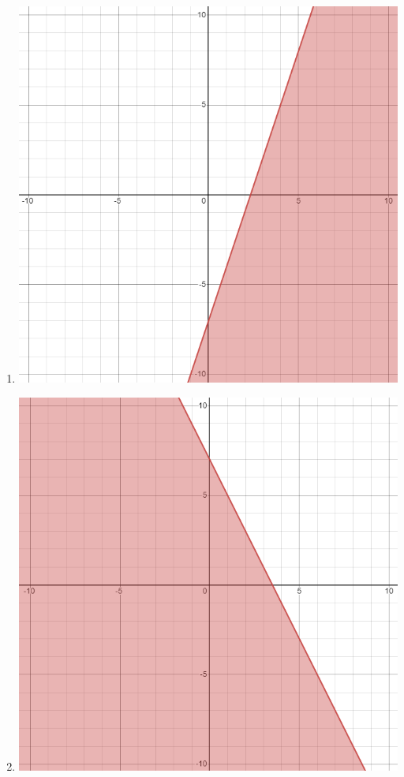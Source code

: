 \begin{enumerate}
\begin{enumerate}
\begin{center}
\end{center}\newpage
\item \hspace{1mm}
\begin{center}
\includegraphics[scale=0.4]{lin-ineq-ans-5b.png}
\end{center}
\item \hspace{1mm}
\begin{center}
\includegraphics[scale=0.4]{lin-ineq-ans-5c.png}

\end{center}
\end{enumerate}
\end{enumerate}
